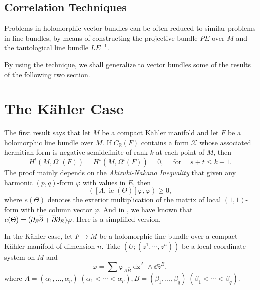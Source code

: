 \documentclass[lang=en,12pt]{beautybook}
\begin{document}
\subsection{Correlation Techniques}

\begin{fancybox}
Problems in holomorphic vector bundles can be often reduced to similar problems in line bundles, by means of constructing the projective bundle $PE$ over $M$ and the tautological line bundle $LE^{-1}$.
\end{fancybox}

By using the technique, we shall generalize to vector bundles some of the results of the following two section.

\section{The K\"ahler Case}
\newcommand{\tmcolor}[2]{{\color{#1}{#2}}}
\newcommand{\tmverbatim}[1]{\text{{\ttfamily{#1}}}}
\newcommand{\tmop}[1]{\ensuremath{\operatorname{#1}}}
\newcommand{\tmstrong}[1]{\textbf{#1}}
\providecommand{\xequal}[2][]{\mathop{=}\limits_{#1}^{#2}}

The first result says that let $M$ be a
compact K\"ahler manifold and let $F$ be a holomorphic line bundle over $M$. If
$C_{\mathbb{R}} (F)$ contains a form $\mathcal{X}$ whose associated hermitian
form is negative semidefinite of rank $k$ at each point of $M$, then
\[ H^t (M, \Omega^s (F)) = H^s (M, \Omega^t (F)) = 0, \quad \tmop{for} \quad
   s + t \leqslant k - 1. \]
The proof mainly depends on the \textit{Akizuki-Nakano Inequality} that given any harmonic $(p,
q)$-form $\varphi$ with values in $E$, then
\begin{equation}
  ([\Lambda, \tmop{ie} (\Theta)] \varphi, \varphi) \geqslant 0, \label{1}
\end{equation}
where $e(\Theta)$ denotes the exterior multiplication of the matrix of local $(1,1)$-form with the column vector $\varphi$. And in \cite[]{calabi1960compact}, we have known that $e(\Theta)=(\partial_E \overline{\partial}+ \overline{\partial}\partial_E)\varphi$.
Here is a simplified version.

In the K\"ahler case, let $F \rightarrow M$ be a holomorphic line bundle over a
compact K\"ahler manifold of dimension $n$. Take $(U ; (z^1, \cdots, z^n))$ be a
local coordinate system on $M$ and
\[ \varphi = \sum \varphi_{A \bar{B} } \tmop{dz}^A \wedge
   \dd \bar z^{B}, \]
where $A=(\alpha_1,\ldots,\alpha_p) \; (\alpha_1<\cdots<\alpha_p), B=(\beta_1,\ldots,\beta_q) \; (\beta_1<\cdots<\beta_q)$.
\end{document}
